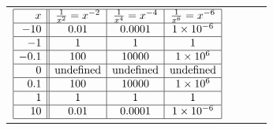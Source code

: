 \documentclass{ximera}
\begin{document}
\begin{tabular}{m{2.75in}m{1.25in}m{1.25in}m{1.25in}}

$\begin{array}{|r||c|c|c|}  \hline

 x &  \frac{1}{x^2} = x^{-2} & \frac{1}{x^4} = x^{-4} & \frac{1}{x^6} = x^{-6} \\ \hline
 -10 &0.01 &0.0001& 1 \times 10^{-6}  \\  \hline
 -1 & 1 & 1&  1\\  \hline
 -0.1 & 100 & 10000 &  1 \times 10^{6} \\  \hline
 0 &  \text{undefined} &  \text{undefined}  &  \text{undefined}  \\  \hline
0.1 & 100 & 10000 &  1 \times 10^{6} \\  \hline
 1&  1 & 1&  1 \\  \hline
10 &0.01 &0.0001& 1 \times 10^{-6}  \\  \hline

\end{array}$

&


&


&


\end{tabular}
\end{document}
